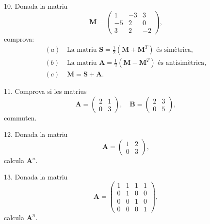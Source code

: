 \documentclass[12pt]{article}
\newcommand{\mat}[1]{\mathbf{#1}}
\begin{document}
\begin{exercici}
10. Donada la matriu 
\[
\mat{M} = 
\begin{pmatrix}
1 & -3 & 3 \\
-5 & 2 & 0 \\
3 & 2 & -2
\end{pmatrix},
\]
comprova:
\begin{align*}
(a) &\, \text{La matriu } \mat{S} = \frac{1}{2} (\mat{M} + \mat{M}^T) \text{ és simètrica}, \\
(b) &\, \text{La matriu } \mat{A} = \frac{1}{2} (\mat{M} - \mat{M}^T) \text{ és antisimètrica}, \\
(c) &\, \mat{M} = \mat{S} + \mat{A}.
\end{align*}

\end{exercici}

\begin{exercici}
11. Comprova si les matrius 
\[
\mat{A} = 
\begin{pmatrix}
2 & 1 \\
0 & 3
\end{pmatrix}, \quad 
\mat{B} = 
\begin{pmatrix}
2 & 3 \\
0 & 5
\end{pmatrix},
\]
commuten.
\end{exercici}

\begin{exercici}
12. Donada la matriu 
\[
\mat{A} = 
\begin{pmatrix}
1 & 2 \\
0 & 3
\end{pmatrix},
\]
calcula $\mat{A}^n$.
\end{exercici}

\begin{exercici}
13. Donada la matriu 
\[
\mat{A} = 
\begin{pmatrix}
1 & 1 & 1 & 1 \\
0 & 1 & 0 & 0 \\
0 & 0 & 1 & 0 \\
0 & 0 & 0 & 1
\end{pmatrix},
\]
calcula $\mat{A}^n$.
\end{exercici}
\end{document}
